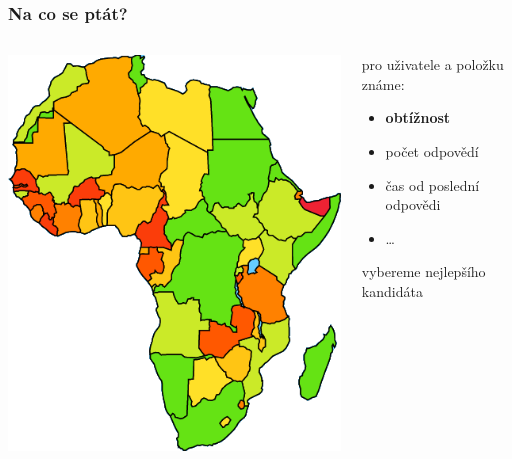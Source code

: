 \documentclass[xcolor=svgnames]{beamer}
\begin{document}
\begin{frame}
	\frametitle{Na co se ptát?}
	\begin{columns}
		\begin{column}{.5\textwidth}
			\begin{center}
				\includegraphics[width=\textwidth]{img/africa_me}
			\end{center}
		\end{column}
		\begin{column}{.5\textwidth}
		pro uživatele a položku známe:
			\begin{itemize}
				\item \textbf{obtížnost}
				\item počet odpovědí
				\item čas od poslední odpovědi
				\item \ldots
			\end{itemize}
		vybereme nejlepšího kandidáta
		\end{column}
	\end{columns}
\end{frame}
\end{document}
